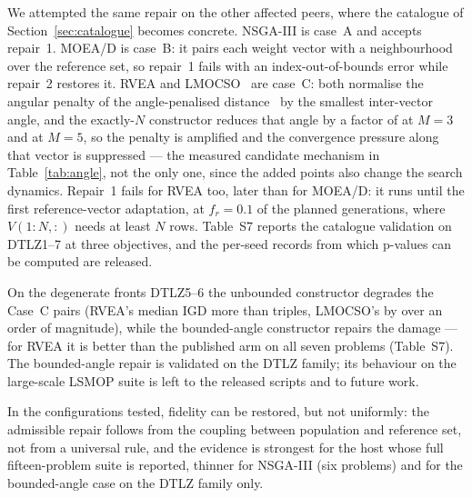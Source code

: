 \documentclass{SCIS2026}
\begin{document}
We attempted the same repair on the other affected peers, where the catalogue of Section~\ref{sec:catalogue} becomes concrete. NSGA-III is case~A and accepts repair~1. MOEA/D is case~B: it pairs each weight vector with a neighbourhood over the reference set, so repair~1 fails with an index-out-of-bounds error while repair~2 restores it. RVEA and LMOCSO~\cite{33} are case~C: both normalise the angular penalty of the angle-penalised distance~\cite{3} by the smallest inter-vector angle, and the exactly-$N$ constructor reduces that angle by a factor of \angRatioThree{} at $M=3$ and \angRatioFive{} at $M=5$, so the penalty is amplified and the convergence pressure along that vector is suppressed --- the measured candidate mechanism in Table~\ref{tab:angle}, not the only one, since the added points also change the search dynamics. Repair~1 fails for RVEA too, later than for MOEA/D: it runs until the first reference-vector adaptation, at $f_r=0.1$ of the planned generations, where $V(1:N,:)$ needs at least $N$ rows. Table~S7 reports the catalogue validation on DTLZ1--7 at three objectives, and the per-seed records from which p-values can be computed are released.

On the degenerate fronts DTLZ5--6 the unbounded constructor degrades the Case~C pairs (RVEA's median IGD more than triples, LMOCSO's by over an order of magnitude), while the bounded-angle constructor repairs the damage --- for RVEA it is better than the published arm on all seven problems (Table~S7). The bounded-angle repair is validated on the DTLZ family; its behaviour on the large-scale LSMOP suite is left to the released scripts and to future work.

In the configurations tested, fidelity can be restored, but not uniformly: the admissible repair follows from the coupling between population and reference set, not from a universal rule, and the evidence is strongest for the host whose full fifteen-problem suite is reported, thinner for NSGA-III (six problems) and for the bounded-angle case on the DTLZ family only.

\begin{table}[!t]
\centering
\footnotesize
\caption{NSGA-III with the published override and with the requested population size restored by repair 1, on six large-scale problems. NSGA-III is case~A, so repair~1 leaves the reference set untouched; the realised population is \retMthree{} in the published row and 100 after the repair, as in Table~\ref{tab:abc}. The $p$-values are uncorrected and are reported as a sensitivity analysis; they are not used for a cross-algorithm significance claim}
\label{tab:peer}

\end{table}
\end{document}
